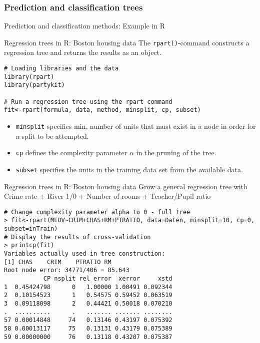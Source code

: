 \documentclass{beamer}
\newcommand{\code}[1]{\texttt{#1}}
\begin{document}
\subsubsection{Prediction and classification trees}

\begin{frame}
	\begin{center}
		\Large{\textcolor{dkblue}{Prediction and classification methods: Example in R  }}
	\end{center}
\end{frame}


\begin{frame}[fragile]{Regression trees in R: Boston housing data}
The \code{rpart()}-command constructs a regression tree and returns the results as an object.

\begin{lstlisting}
# Loading libraries and the data
library(rpart)
library(partykit)

# Run a regression tree using the rpart command
fit<-rpart(formula, data, method, minsplit, cp, subset)
\end{lstlisting}
\begin{itemize}
  \item \code{minsplit} specifies min. number of units that must exist in a node in order for a split to be attempted.
  \item \code{cp} defines the complexity parameter $\alpha$ in the pruning of the tree.
   \item \code{subset} specifies the units in the training data set from the available data.
\end{itemize}
\end{frame}

\begin{frame}[fragile]{Regression trees in R: Boston housing data}
Grow a general regression tree with\\
Crime rate + River 1/0 + Number of rooms + Teacher/Pupil ratio

\begin{lstlisting}
# Change complexity parameter alpha to 0 - full tree
> fit<-rpart(MEDV~CRIM+CHAS+RM+PTRATIO, data=Daten, minsplit=10, cp=0, subset=inTrain)
# Display the results of cross-validation
> printcp(fit)
Variables actually used in tree construction:
[1] CHAS    CRIM    PTRATIO RM
Root node error: 34771/406 = 85.643
           CP nsplit rel error  xerror     xstd
1  0.45424798      0   1.00000 1.00491 0.092344
2  0.10154523      1   0.54575 0.59452 0.063519
3  0.09118098      2   0.44421 0.50018 0.070210
.  ..........      .   ....... ....... ........
57 0.00014848     74   0.13146 0.43197 0.075392
58 0.00013117     75   0.13131 0.43179 0.075389
59 0.00000000     76   0.13118 0.43207 0.075387
\end{lstlisting}
\end{frame}
\end{document}
